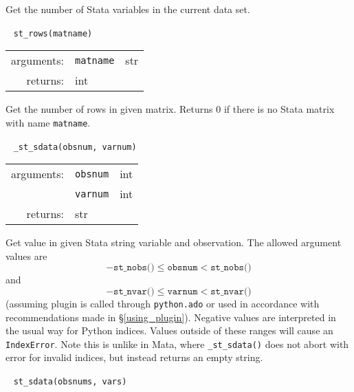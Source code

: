 \documentclass{article}
\begin{document}
			\vspace{1.5mm}
			\noindent Get the number of Stata variables in the current data set. \newline
			
			
			\ \newline
			\noindent \lstinline$st_rows(matname)$
								
			\vspace{1.5mm}
			\noindent 
			\indent \begin{tabular}{rrl}
					arguments: & \texttt{matname} & str \\
					returns: & \multicolumn{2}{l}{int}
				\end{tabular}
								
			\vspace{1.5mm}
			\noindent Get the number of rows in given matrix. Returns 0 if there is no Stata matrix with name \lstinline$matname$. \newline
			
			
			\ \newline
			\noindent \lstinline$_st_sdata(obsnum, varnum)$
								
			\vspace{1.5mm}
			\noindent 
			\indent \begin{tabular}{rrl}
					arguments: & \texttt{obsnum} & int \\
						& \texttt{varnum} & int \\
					returns: & \multicolumn{2}{l}{str}
				\end{tabular}
								
			\vspace{1.5mm}
			\noindent Get value in given Stata string variable and observation. The allowed argument values are 
			\[
				-\texttt{st\_nobs()} \leq \texttt{obsnum} < \texttt{st\_nobs()}
			\]
			and
			\[
				-\texttt{st\_nvar()} \leq \texttt{varnum} < \texttt{st\_nvar()}
			\]
			(assuming plugin is called through \lstinline$python.ado$ or used in accordance with recommendations made in \S\ref{using_plugin}). Negative values are interpreted in the usual way for Python indices. Values outside of these ranges will cause an \lstinline$IndexError$. Note this is unlike in Mata, where \lstinline{_st_sdata()} does not abort with error for invalid indices, but instead returns an empty string. \newline
			
			
			\ \newline
			\noindent \lstinline$st_sdata(obsnums, vars)$
								
\end{document}
